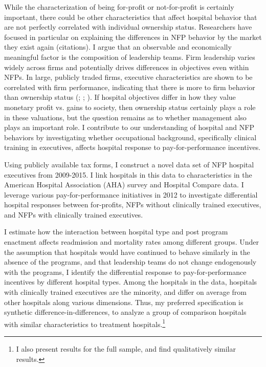 \documentclass[12pt]{article}
\begin{document}
  While the characterization of being for-profit or not-for-profit is certainly important, there could be other characteristics that affect hospital behavior that are not perfectly correlated with individual ownership status. Researchers have focused in particular on explaining the differences in NFP behavior by the market they exist again (citations). I argue that an observable and economically meaningful factor is the composition of leadership teams. Firm leadership varies widely across firms and potentially drives differences in objectives even within NFPs. In large, publicly traded firms, executive characteristics are shown to be correlated with firm performance, indicating that there is more to firm behavior than ownership status (\cite{bertrand2003managing}; \cite{matsa2013female}; \cite{ahern2012changing}). If hospital objectives differ in how they value monetary profit vs. gains to society, then ownership status certainly plays a role in these valuations, but the question remains as to whether management also plays an important role. I contribute to our understanding of hospital and NFP behaviors by investigating whether occupational background, specifically clinical training in executives, affects hospital response to pay-for-performance incentives.

  Using publicly available tax forms, I construct a novel data set of NFP hospital executives from 2009-2015. I link hospitals in this data to characteristics in the American Hospital Association (AHA) survey and Hospital Compare data. I leverage various pay-for-performance initiatives in 2012 to investigate differential hospital responses between for-profits, NFPs without clinically trained executives, and NFPs with clinically trained executives. 
  
  I estimate how the interaction between hospital type and post program enactment affects readmission and mortality rates among different groups. Under the assumption that hospitals would have continued to behave similarly in the absence of the programs, and that leadership teams do not change endogenously with the programs, I identify the differential response to pay-for-performance incentives by different hospital types. Among the hospitals in the data, hospitals with clinically trained executives are the minority, and differ on average from other hospitals along various dimensions. Thus, my preferred specification is synthetic difference-in-differences, to analyze a group of comparison hospitals with similar characteristics to treatment hospitals.\footnote{I also present results for the full sample, and find qualitatively similar results.} 
  
\end{document}
